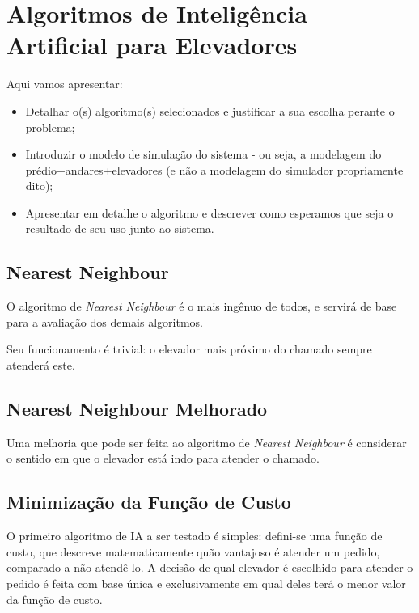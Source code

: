 \chapter{\label{chap:ai}Algoritmos de Inteligência Artificial para Elevadores}

Aqui vamos apresentar:

\begin{itemize}
\item Detalhar o(s) algoritmo(s) selecionados e justificar a sua escolha perante o problema;
\item Introduzir o modelo de simulação do sistema - ou seja, a modelagem do
prédio+andares+elevadores (e não a modelagem do simulador propriamente dito);
\item Apresentar em detalhe o algoritmo e descrever como esperamos que seja o resultado de seu uso junto ao sistema.
\end{itemize}

\section{\label{sec:ai:nn}Nearest Neighbour}

O algoritmo de \textit{Nearest Neighbour} é o mais ingênuo de todos, e servirá
de base para a avaliação dos demais algoritmos.

Seu funcionamento é trivial: o elevador mais próximo do chamado sempre
atenderá este.

\section{\label{sec:ai:nnm}Nearest Neighbour Melhorado}

Uma melhoria que pode ser feita ao algoritmo de \textit{Nearest Neighbour}
é considerar o sentido em que o elevador está indo para atender o chamado.

\section{\label{sec:ai:minimize-cost-function}Minimização da Função de Custo}

O primeiro algoritmo de IA a ser testado é simples: defini-se uma
função de custo, que descreve matematicamente quão vantajoso é atender um
pedido, comparado a não atendê-lo. A decisão de qual elevador é escolhido para
atender o pedido é feita com base única e exclusivamente em qual deles terá o
menor valor da função de custo.

